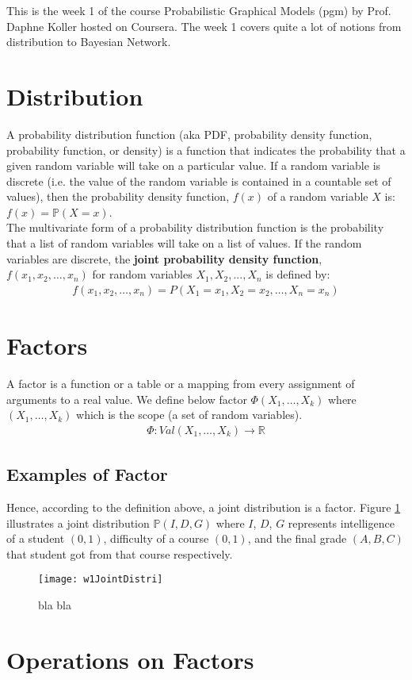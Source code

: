 This is the week 1 of the course Probabilistic Graphical Models (pgm) by Prof. Daphne Koller hosted on Coursera. The week 1 covers quite a lot of notions from distribution to Bayesian Network.

\section{Distribution}
A probability distribution function (aka PDF, probability density function, probability function, or density) is a function that indicates the probability that a given random variable will take on a particular value. If a random variable is discrete (i.e. the value of the random variable is contained in a countable set of values), then the probability density function, $f(x)$ of a random variable $X$ is: $f(x) = \mathbb{P}(X = x)$.\\

The multivariate form of a probability distribution function is the probability that a list of random variables will take on a list of values. If the random variables are discrete, the \textbf{joint probability density function}, $f(x_1, x_2, …, x_n)$ for random variables $X_1, X_2, ..., X_n$ is defined by: 
\begin{align}
f(x_1, x_2, \ldots, x_n) = P(X_1=x_1, X_2=x_2, \ldots, X_n=x_n)
\end{align}

\section{Factors}
A factor is a function or a table or a mapping from every assignment of arguments to a real value. We define below factor $\Phi(X_1, \ldots, X_k)$ where $(X_1, \ldots, X_k)$ which is the scope (a set of random variables).
\begin{align}
\Phi: Val(X_1, \ldots, X_k) \rightarrow \mathbb{R}
\end{align}

\subsection{Examples of Factor}
Hence, according to the definition above, a joint distribution is a factor. Figure \ref{w1JointDistri} illustrates a joint distribution $\mathbb{P}(I,D,G)$ where $I$, $D$, $G$ represents intelligence of a student $(0, 1)$, difficulty of a course $(0,1)$, and the final grade $(A,B,C)$ that student got from that course respectively.
\begin{figure}[!ht]
\centering
\texttt{[image: w1JointDistri]}
\caption{bla bla}
\label{w1JointDistri}
\end{figure}

\section{Operations on Factors}